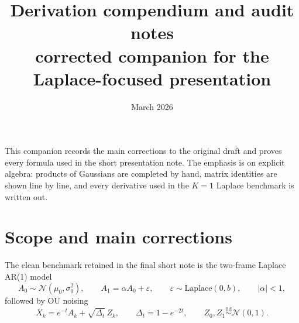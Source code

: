 \documentclass[11pt,a4paper]{article}
\title{\textbf{\color{accent}Derivation compendium and audit notes}\\[2mm]
\Large corrected companion for the Laplace-focused presentation}
\author{}
\date{March 2026}
\newcommand{\Dt}{\Delta_t}
\begin{document}
\maketitle
\vspace{-1.0em}

\begin{center}
\begin{minipage}{0.97\textwidth}
\small
This companion records the main corrections to the original draft and proves every formula used in the short presentation note. The emphasis is on explicit algebra: products of Gaussians are completed by hand, matrix identities are shown line by line, and every derivative used in the $K=1$ Laplace benchmark is written out.
\end{minipage}
\end{center}

\tableofcontents
\bigskip

\section{Scope and main corrections}

The clean benchmark retained in the final short note is the two-frame Laplace AR(1) model
\begin{equation}
A_0 \sim \mathcal N(\mu_0,\sigma_0^2),
\qquad
A_1 = \alpha A_0 + \varepsilon,
\qquad
\varepsilon \sim \mathrm{Laplace}(0,b),
\qquad |\alpha|<1,
\label{eq:setup-clean}
\end{equation}
followed by OU noising
\begin{equation}
X_k = e^{-t} A_k + \sqrt{\Dt} \, Z_k,
\qquad
\Dt = 1-e^{-2t},
\qquad
Z_0,Z_1 \stackrel{\mathrm{iid}}{\sim} \mathcal N(0,1).
\label{eq:setup-ou}
\end{equation}
\end{document}
